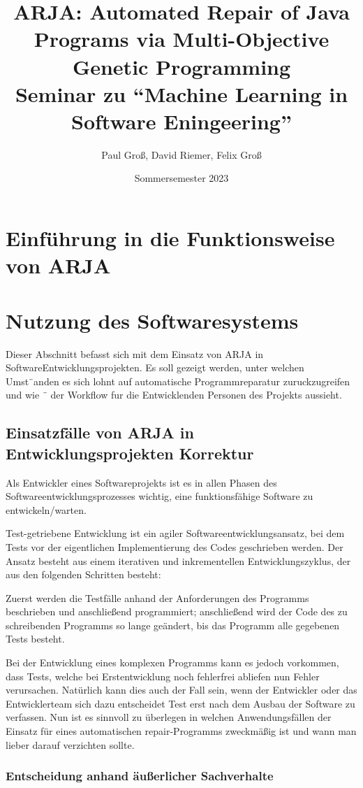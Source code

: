 \documentclass[11pt,a4paper]{article}
\title{ARJA: Automated Repair of Java Programs via
Multi-Objective Genetic Programming \\[0.5em] \large{Seminar zu ``Machine Learning in Software Eningeering'' \\[0.5em]} }
\author{Paul Groß, David Riemer, Felix Groß}
\date{Sommersemester 2023}
\begin{document}
\maketitle

\section{Einführung in die Funktionsweise von ARJA}
\section{Nutzung des Softwaresystems}
Dieser Abschnitt befasst sich mit dem Einsatz von ARJA in SoftwareEntwicklungsprojekten. Es soll gezeigt werden, unter welchen Umst¨anden
es sich lohnt auf automatische Programmreparatur zuruckzugreifen und wie ¨
der Workflow fur die Entwicklenden Personen des Projekts aussieht.
\subsection{Einsatzfälle von ARJA in Entwicklungsprojekten Korrektur}
Als Entwickler eines Softwareprojekts ist es in allen Phasen des Softwareentwicklungsprozesses wichtig, eine funktionsfähige Software zu entwickeln/warten.

Test-getriebene Entwicklung ist ein agiler Softwareentwicklungsansatz, bei dem Tests vor der eigentlichen Implementierung des Codes geschrieben werden. Der Ansatz besteht aus einem iterativen und inkrementellen Entwicklungszyklus, der aus den folgenden Schritten besteht:

Zuerst werden die Testfälle anhand der Anforderungen des Programms beschrieben und anschließend programmiert; anschließend wird der Code des zu schreibenden Programms so lange geändert, bis das Programm alle gegebenen Tests besteht.

Bei der Entwicklung eines komplexen Programms kann es jedoch vorkommen, dass Tests, welche bei Erstentwicklung noch fehlerfrei abliefen nun Fehler verursachen. Natürlich kann dies auch der Fall sein, wenn der Entwickler oder das Entwicklerteam sich dazu entscheidet Test erst nach dem Ausbau der Software zu verfassen. Nun ist es sinnvoll zu überlegen in welchen Anwendungsfällen der Einsatz für eines automatischen repair-Programms zweckmäßig ist und wann man lieber darauf verzichten sollte.

\subsubsection{Entscheidung anhand äußerlicher Sachverhalte}
\end{document}
